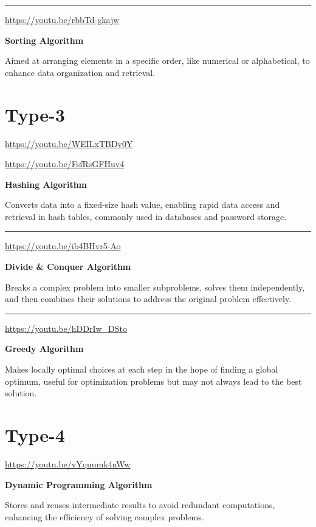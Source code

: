 \documentclass[
  letterpaper,
  DIV=11,
  numbers=noendperiod]{scrreprt}
\begin{document}
\begin{center}\rule{0.5\linewidth}{0.5pt}\end{center}

\url{https://youtu.be/rbbTd-gkajw}

\textbf{Sorting Algorithm}

Aimed at arranging elements in a specific order, like numerical or
alphabetical, to enhance data organization and retrieval.

\section{Type-3}

\url{https://youtu.be/WEILxTBDy0Y}

\url{https://youtu.be/FsfRsGFHuv4}

\textbf{Hashing Algorithm}

Converts data into a fixed-size hash value, enabling rapid data access
and retrieval in hash tables, commonly used in databases and password
storage.

\begin{center}\rule{0.5\linewidth}{0.5pt}\end{center}

\url{https://youtu.be/ib4BHvr5-Ao}

\textbf{Divide \& Conquer Algorithm}

Breaks a complex problem into smaller subproblems, solves them
independently, and then combines their solutions to address the original
problem effectively.

\begin{center}\rule{0.5\linewidth}{0.5pt}\end{center}

\url{https://youtu.be/hDDrIw_DSto}

\textbf{Greedy Algorithm}

Makes locally optimal choices at each step in the hope of finding a
global optimum, useful for optimization problems but may not always lead
to the best solution.

\section{Type-4}

\url{https://youtu.be/vYquumk4nWw}

\textbf{Dynamic Programming Algorithm}

Stores and reuses intermediate results to avoid redundant computations,
enhancing the efficiency of solving complex problems.
\end{document}
